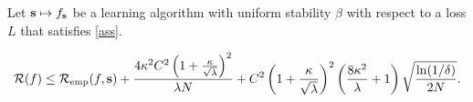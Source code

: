 \begin{theorem}
    Let $\boldsymbol{\mathbf{s}}\mapsto f_{\boldsymbol{\mathbf{s}}}$ be a learning algorithm with uniform
    stability $\beta$ with respect to a loss $L$ that satisfies \cref{ass}.
\end{theorem}

\begin{dmath}
    \risk{f} \le \riskemp{f, \seq{s}}  + \frac{4\kappa^2 C^2 \left(1 +
    \frac{\kappa}{\sqrt{\lambda}} \right)^2 }{\lambda N} + C^2\left( 1 +
    \frac{\kappa}{\sqrt{\lambda}} \right)^2\left( \frac{8\kappa^2}{\lambda} + 1
    \right)\sqrt{\frac{\ln(1/\delta)}{2N}}.
\end{dmath}




